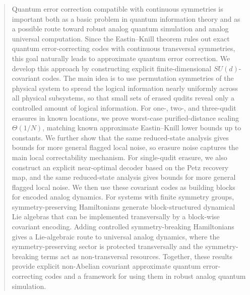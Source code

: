\documentclass[10pt,twocolumn,superscriptaddress,aps,amsmath,amssymb,citeautoscript,floatfix,prx,longbibliography]{revtex4-2}
\makeatletter
\def\maketitle{
\@author@finish
\title@column\titleblock@produce
\suppressfloats[t]}
\newcounter{alg}
\theoremstyle{plain}
\theoremstyle{plain}
\theoremstyle{plain}
\theoremstyle{plain}
\theoremstyle{plain}
\theoremstyle{plain}
\makeatother
\begin{document}
\begin{abstract}
Quantum error correction compatible with continuous symmetries is important both as a basic problem in quantum information theory and as a possible route toward robust analog quantum simulation and analog universal computation. Since the Eastin--Knill theorem rules out exact quantum error-correcting codes with continuous transversal symmetries, this goal naturally leads to approximate quantum error correction. We develop this approach by constructing explicit finite-dimensional \(SU(d)\)-covariant codes. The main idea is to use permutation symmetries of the physical system to spread the logical information nearly uniformly across all physical subsystems, so that small sets of erased qudits reveal only a controlled amount of logical information. For one-, two-, and three-qudit erasures in known locations, we prove worst-case purified-distance scaling \(\Theta(1/N)\), matching known approximate Eastin--Knill lower bounds up to constants. We further show that the same reduced-state analysis gives bounds for more general flagged local noise, so erasure noise captures the main local correctability mechanism. For single-qudit erasure, we also construct an explicit near-optimal decoder based on the Petz recovery map, and the same reduced-state analysis gives bounds for more general flagged local noise.
We then use these covariant codes as building blocks for encoded analog dynamics. For systems with finite symmetry groups, symmetry-preserving Hamiltonians generate block-structured dynamical Lie algebras that can be implemented transversally by a block-wise covariant encoding. Adding controlled symmetry-breaking Hamiltonians gives a Lie-algebraic route to universal analog dynamics, where the symmetry-preserving sector is protected transversally and the symmetry-breaking terms act as non-transversal resources. Together, these results provide explicit non-Abelian covariant approximate quantum error-correcting codes and a framework for using them in robust analog quantum simulation.
\end{abstract}
\maketitle 
\end{document}

